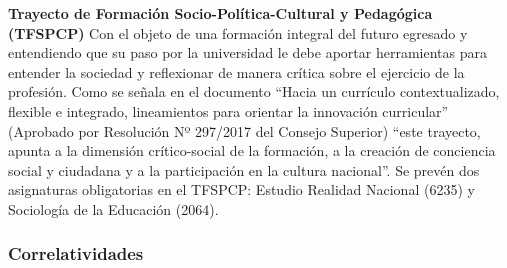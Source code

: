 \documentclass[a4paper, 12pt]{article}
\begin{document}
\begin{description}
\item{\textbf{Trayecto de Formación Socio-Política-Cultural y Pedagógica (TFSPCP)}}  Con el objeto de una formación integral del futuro egresado y entendiendo que su paso por la universidad le debe aportar herramientas para entender la sociedad y reflexionar de manera crítica sobre el ejercicio de la profesión. Como se señala en el documento  ``Hacia un currículo contextualizado, 
flexible e integrado, lineamientos para orientar la innovación curricular'' (Aprobado por Resolución Nº 297/2017 del Consejo Superior) ``este trayecto, apunta a la dimensión crítico-social de la formación, a la creación de conciencia social y ciudadana y a la participación en la cultura nacional''. Se prevén dos asignaturas obligatorias en el   TFSPCP: Estudio Realidad Nacional (6235) y Sociología de la Educación (2064).







\end{description}



\subsubsection{Correlatividades}
 
\end{document}
